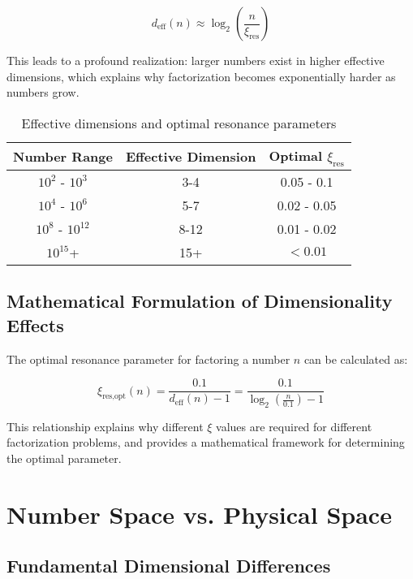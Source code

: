 \documentclass[12pt,a4paper]{article}
\newcommand{\xipar}{\ensuremath{\xi}}
\begin{document}
	\begin{equation}
		d_{\text{eff}}(n) \approx \log_2\left(\frac{n}{\xipar_{\text{res}}}\right)
	\end{equation}
	
	This leads to a profound realization: larger numbers exist in higher effective dimensions, which explains why factorization becomes exponentially harder as numbers grow.
	
	\begin{table}[htbp]
		\centering
		\begin{tabular}{ccc}
			\toprule
			\textbf{Number Range} & \textbf{Effective Dimension} & \textbf{Optimal $\xipar_{\text{res}}$} \\
			\midrule
			$10^2$ - $10^3$ & 3-4 & 0.05 - 0.1 \\
			$10^4$ - $10^6$ & 5-7 & 0.02 - 0.05 \\
			$10^8$ - $10^{12}$ & 8-12 & 0.01 - 0.02 \\
			$10^{15}$+ & 15+ & $<0.01$ \\
			\bottomrule
		\end{tabular}
		\caption{Effective dimensions and optimal resonance parameters}
		\label{tab:effective_dimensions}
	\end{table}
	
	\subsection{Mathematical Formulation of Dimensionality Effects}
	\label{subsec:mathematical_formulation}
	
	The optimal resonance parameter for factoring a number $n$ can be calculated as:
	
	\begin{equation}
		\xipar_{\text{res,opt}}(n) = \frac{0.1}{d_{\text{eff}}(n)-1} = \frac{0.1}{\log_2\left(\frac{n}{0.1}\right)-1}
	\end{equation}
	
	This relationship explains why different $\xipar$ values are required for different factorization problems, and provides a mathematical framework for determining the optimal parameter.
	
	\section{Number Space vs. Physical Space}
	\label{sec:number_physical_space}
	
	\subsection{Fundamental Dimensional Differences}
	\label{subsec:dimensional_differences}
	
\end{document}
